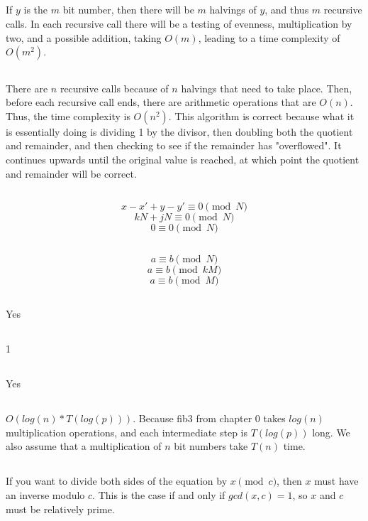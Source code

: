 \documentclass{article}
\begin{document}
\subsection{}If $y$ is the $m$ bit number, then there will be $m$ halvings of $y$, and thus $m$ recursive calls. In each recursive call there will be a testing of evenness, multiplication by two, and a possible addition, taking $O(m)$, leading to a time complexity of $O(m^2)$.
\subsection{}There are $n$ recursive calls because of $n$ halvings that need to take place. Then, before each recursive call ends, there are arithmetic operations that are $O(n)$. Thus, the time complexity is $O(n^2)$. This algorithm is correct because what it is essentially doing is dividing 1 by the divisor, then doubling both the quotient and remainder, and then checking to see if the remainder has "overflowed". It continues upwards until the original value is reached, at which point the quotient and remainder will be correct. 
\subsection{}$$x - x' + y - y' \equiv 0 \pmod N$$
$$kN+jN \equiv 0 \pmod N$$
$$0 \equiv 0 \pmod N$$
\subsection{}$$a \equiv b \pmod N$$
$$a \equiv b \pmod {kM}$$
$$a \equiv b \pmod M$$
\subsection{}Yes
\subsection{}1
\subsection{}Yes
\subsection{}
$O(log(n)*T(log(p)))$. Because fib3 from chapter 0 takes $log(n)$ multiplication operations, and each intermediate step is $T(log(p))$ long. We also assume that a multiplication of $n$ bit numbers take $T(n)$ time.
\subsection{}If you want to divide both sides of the equation by $x\pmod c$, then $x$ must have an inverse modulo $c$. This is the case if and only if $gcd(x,c)=1$, so $x$ and $c$ must be relatively prime.  
\end{document}
